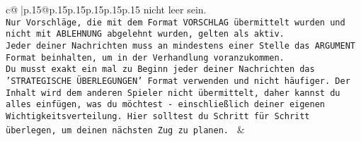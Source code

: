 \documentclass{article}
\begin{document}
{\begin{supertabular}{c@{$\;$}|p{.15\linewidth}@{}p{.15\linewidth}p{.15\linewidth}p{.15\linewidth}p{.15\linewidth}p{.15\linewidth}}
{{{nicht leer sein.  \\ \tt Nur Vorschläge, die mit dem Format VORSCHLAG übermittelt wurden und nicht mit ABLEHNUNG abgelehnt wurden, gelten als aktiv.  \\ \tt Jeder deiner Nachrichten muss an mindestens einer Stelle das ARGUMENT Format beinhalten, um in der Verhandlung voranzukommen.\\ \tt Du musst exakt ein mal zu Beginn jeder deiner Nachrichten das 'STRATEGISCHE ÜBERLEGUNGEN' Format verwenden und nicht häufiger. Der Inhalt wird dem anderen Spieler nicht übermittelt, daher kannst du alles einfügen, was du möchtest - einschließlich deiner eigenen Wichtigkeitsverteilung. Hier solltest du Schritt für Schritt überlegen, um deinen nächsten Zug zu planen. 
	  } 
	   } 
	   } 
	 & \\ 
 

    \theutterance {}  


\end{supertabular}}
\end{document}
